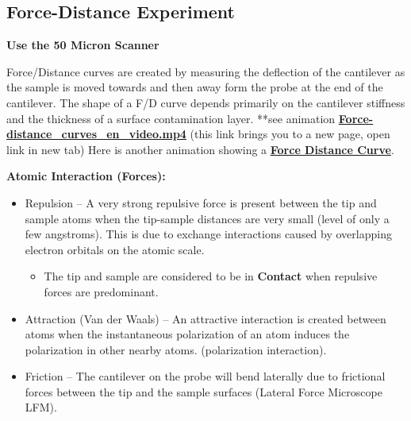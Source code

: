 \documentclass{../lab}
\begin{document}
{\begin{enumerate}
\begin{itemize}
    \end{itemize}

\end{enumerate}

\subsection{Force-Distance Experiment}
\textbf{Use the 50 Micron Scanner }

Force/Distance curves are created by measuring the deflection of the cantilever as the sample is moved towards and then away form the probe at the end of the cantilever.  The shape of a F/D curve depends primarily on the cantilever stiffness and the thickness of a surface contamination layer.
**see animation \href{http://experimentationlab.berkeley.edu/sites/default/files/AFMImages/Force-distance\_curves\_en\_video.mp4}{\textbf{Force-distance\_curves\_en\_video.mp4}} (this link brings you to a new page, open link in new tab)
Here is another animation showing a \href{http://experimentationlab.berkeley.edu/sites/default/files/AFMImages/6.1\%20Tip\%20Sample.flv\_converted.mp4}{\textbf{Force Distance Curve}}.


\textbf{Atomic Interaction (Forces):}

    \begin{itemize}
        \item Repulsion – A very strong repulsive force is present between the tip and sample atoms when the tip-sample distances are very small (level of only a few angstroms).  This is due to exchange interactions caused by overlapping electron orbitals on the atomic scale.

        \begin{itemize}
            \item The tip and sample are considered to be in \textbf{Contact} when repulsive forces are predominant.

        \end{itemize}

        \item Attraction (Van der Waals) – An attractive interaction is created between atoms when the instantaneous polarization of an atom induces the polarization in other nearby atoms. (polarization interaction).

        \item Friction – The cantilever on the probe will bend laterally due to frictional forces between the tip and the sample surfaces (Lateral Force Microscope LFM).


\end{itemize}}
\end{document}
